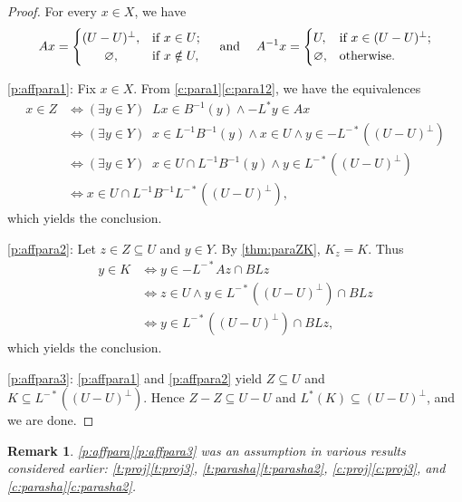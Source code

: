 \documentclass{article}
\providecommand{\siff}{\Leftrightarrow}
\newtheorem{remark}[theorem]{Remark}
\newcommand{\ift}{\ensuremath{\text{if }}}
\begin{document}
\begin{proof}
For every $x\in X$, we have 
\begin{equation}
Ax=\begin{cases}
(U-U)^\perp,&\ift x\in U;\\
\hfil\varnothing,&\ift x\notin U,
\end{cases}
\quad\;\text{and}\quad\;
A^{-1}x=\begin{cases}
U,&\ift x\in (U-U)^\perp;\\
\varnothing,&\text{otherwise}.
\end{cases}
\end{equation}

\cref{p:affpara1}:
Fix $x\in X$. 
From \cref{c:para1}\cref{c:para12}, we have the equivalences
\begin{subequations}
\begin{align}
x\in Z
&\siff (\exists y\in Y)\;\; 
Lx\in B^{-1}(y) \land -L^*y\in Ax \\
&\siff (\exists y\in Y)\;\; 
x\in L^{-1}B^{-1}(y) \land x\in U \land y\in -L^{-*}((U-U)^\perp)\\
&\siff (\exists y\in Y)\;\; 
x\in U \cap L^{-1}B^{-1}(y) \land y\in L^{-*}((U-U)^\perp)\\
&\siff 
x\in U\cap L^{-1}B^{-1}L^{-*}((U-U)^\perp),
\end{align}
\end{subequations}
which yields the conclusion. 

\cref{p:affpara2}: 
Let $z\in Z \subseteq U$ and $y\in Y$. 
By \cref{thm:paraZK}, $K_z=K$. 
Thus 
\begin{subequations}
\begin{align}
y\in K
&\siff y \in -L^{-*}Az \cap BLz\\
&\siff 
z \in U \land  y\in L^{-*}((U-U)^\perp) \cap BLz
\\
&\siff 
y\in L^{-*}((U-U)^\perp) \cap BLz, 
\end{align}
\end{subequations}
which yields the conclusion. 


\cref{p:affpara3}: 
\cref{p:affpara1} and \cref{p:affpara2} yield
$Z\subseteq U$ and $K\subseteq L^{-*}((U-U)^\perp)$.
Hence 
$Z-Z\subseteq U-U$ and $L^*(K) \subseteq (U-U)^\perp$, 
and we are done. 
\end{proof}


\begin{remark} 
\cref{p:affpara}\cref{p:affpara3} was an assumption in various results 
considered earlier: 
\cref{t:proj}\cref{t:proj3}, 
\cref{t:parasha}\cref{t:parasha2},
\cref{c:proj}\cref{c:proj3}, and
\cref{c:parasha}\cref{c:parasha2}. 
\end{remark}
\end{document}
